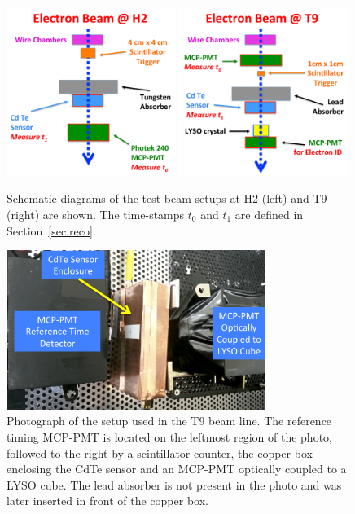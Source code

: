 \begin{figure}[htbp] 
\centering
\includegraphics[width=0.49\textwidth]{figures/H2_BeamSchematicDiagram.pdf} 
\includegraphics[width=0.49\textwidth]{figures/T9_BeamSchematicDiagram.pdf} 
\caption{Schematic diagrams of the test-beam setups at H2 (left) and T9 (right) are shown. 
The time-stamps $t_0$ and $t_1$ are defined in Section~\ref{sec:reco}.} 
\label{fig:BeamSchematicDiagram} 
\end{figure} 

\begin{figure}[htbp] 
\centering
\includegraphics[width=0.75\textwidth]{figures/T9SetupPhoto.pdf} 
\caption{ Photograph of the setup used in the T9 beam line. The reference timing MCP-PMT 
is located on the leftmost region of the photo, followed to the right by a scintillator counter, 
the copper box enclosing the CdTe sensor and an MCP-PMT optically coupled to a LYSO cube. 
The lead absorber is not present in the photo and was later inserted in front of the copper box.} 
\label{fig:SetupPhoto} 
\end{figure} 


